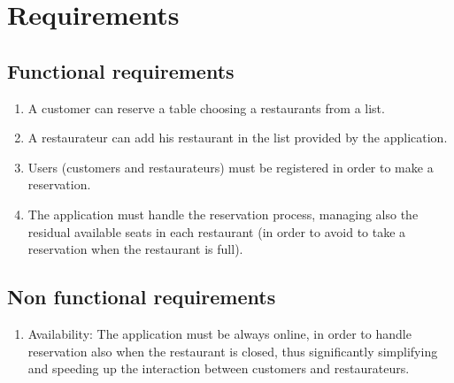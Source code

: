 \section{Requirements}

\subsection{Functional requirements}
\begin{enumerate}
	\item A customer can reserve a table choosing a restaurants from a list.
	\item A restaurateur can add his restaurant in the list provided by the
		application.
	\item Users (customers and restaurateurs) must be registered in order to
		make a reservation.
	\item The application must handle the reservation process, managing also
		the residual available seats in each restaurant (in order to
		avoid to take a reservation when the restaurant is full).
\end{enumerate}

\subsection{Non functional requirements}
\begin{enumerate}
	\item Availability: The application must be always online, in order to
		handle reservation also when the restaurant is closed, thus
		significantly simplifying and speeding up the interaction
		between customers and restaurateurs.
\end{enumerate}
